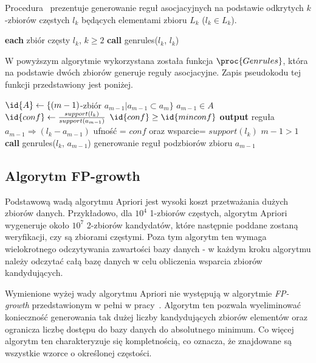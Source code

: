 Procedura~ prezentuje generowanie reguł asocjacyjnych na podstawie odkrytych $k$-zbiorów częstych $l_k$ będących elementami zbioru $L_k$ ($l_k \in L_k$).

\begin{codebox}
		\li \For \textbf{each} zbiór częsty $l_k$, $k \geq 2$ 
		\li \Do
			\textbf{call} genrules($l_k$, $l_k$)
			\End
		\End
\end{codebox}

W powyższym algorytmie wykorzystana została funkcja $\proc{Genrules}$, która na podstawie dwóch zbiorów generuje reguły asocjacyjne. Zapis pseudokodu tej funkcji przedstawiony jest poniżej.

\begin{codebox}
		\li $\id{A} \gets \lbrace (m-1)$-zbiór $a_{m-1} | a_{m-1} \subset a_m \rbrace$
		\li \For $a_{m-1} \in A$
			\li \Do
			$\id{conf} \gets \frac{support(l_k)}{support(a_{m-1})}$
			\li \If $\id{conf} \geq \id{minconf}$
				\li \Then
						\textbf{output} reguła $a_{m-1} \Rightarrow (l_k - a_{m-1})$ \CommentSymbol ufność = $conf$ oraz wsparcie= $support(l_k)$
						\li \If $m-1 > 1$ 
							\li \Then
							\textbf{call} genrules($l_k$, $a_{m-1}$) \CommentSymbol generowanie reguł podzbiorów zbioru $a_{m-1}$
						\End
				\End
			\End
		\End
\end{codebox}

\subsection{Algorytm FP-growth}

Podstawową wadą algorytmu Apriori jest wysoki koszt przetważania dużych zbiorów danych. Przykładowo, dla $10^4$ 1-zbiorów częstych, algorytm Apriori wygeneruje około $10^7$ 2-zbiorów kandydatów, które następnie poddane zostaną weryfikacji, czy są zbiorami częstymi. Poza tym algorytm ten wymaga wielokrotnego odczytywania zawartości bazy danych - w każdym kroku algorytmu należy odczytać całą bazę danych w celu obliczenia wsparcia zbiorów kandydujących.

Wymienione wyżej wady algorytmu Apriori nie występują w algorytmie \emph{FP-growth} przedstawionym w pełni w pracy~\cite{Main:FPgrowth}. Algorytm ten pozwala wyeliminować konieczność generowania tak dużej liczby kandydujących zbiorów elementów oraz ogranicza liczbę dostępu do bazy danych do absolutnego minimum.  Co więcej algorytm ten charakteryzuje się kompletnością, co oznacza, że znajdowane są wszystkie wzorce o określonej częstości.


